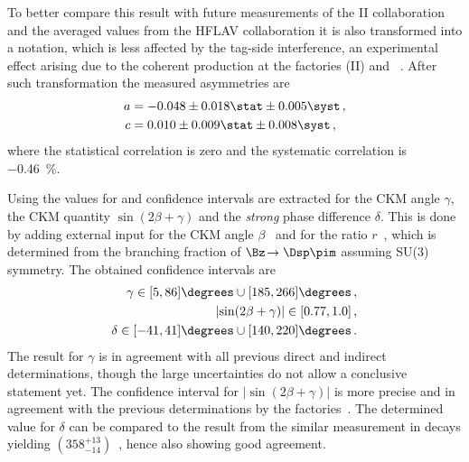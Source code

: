 To better compare this result with future measurements of the \belle II collaboration and the averaged values from the HFLAV collaboration it is also transformed into a notation, which is less affected by the tag-side interference, an experimental effect arising due to the coherent \Bz\Bzb production at the \B factories \belle (II) and \babar~\cite{Long:2003wq}.
After such transformation the measured \CP asymmetries are
\begin{equation}
\begin{aligned}
a&=-0.048\pm0.018\stat\pm0.005\syst\,,\nonumber\\
c&=0.010\pm0.009\stat\pm0.008\syst\,,\nonumber\\
\end{aligned}
\end{equation}
where the statistical correlation is zero and the systematic correlation is \SI{-0.46}{\percent}.

Using the values for \Sf and \Sfbar confidence intervals are extracted for the CKM angle $\gamma$, the CKM quantity $\sin\!\left(2\beta+\gamma\right)$ and the \emph{strong} phase difference $\delta$.
This is done by adding external input for the CKM angle $\beta$~\cite{HFLAV2016} and for the ratio $r$~\cite{CKMfitter2015,Aoki:2016frl, Bazavov:2014wgs, Carrasco:2014poa}, which is determined from the branching fraction of $\Bz\!\to\Dsp\pim$ assuming SU(3) symmetry.
The obtained confidence intervals are
\begin{align*}
\gamma\in[5, 86]\degrees\cup[185, 266]\degrees\,,\nonumber\\
\left|\sin\!\left(2\beta+\gamma\right)\right|\in[0.77, 1.0]\,,\nonumber\\
\delta\in[-41, 41]\degrees\cup[140, 220]\degrees\,.\nonumber\\
\end{align*}
The result for $\gamma$ is in agreement with all previous direct and indirect determinations, though the large uncertainties do not allow a conclusive statement yet.
The confidence interval for $\left|\sin\!\left(2\beta+\gamma\right)\right|$ is more precise and in agreement with the previous determinations by the \B factories~\cite{Ronga:2006hv,Aubert:2006tw}.
The determined value for $\delta$ can be compared to the result from the similar measurement in \BsToDsK decays yielding $\left(358^{+13}_{-14}\right)$\degrees~\cite{Aaij:2017lff}, hence also showing good agreement.

